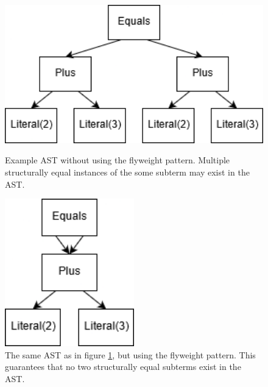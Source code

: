 \documentclass[11pt]{article}
\begin{document}
    \begin{figure}[H]
        \begin{center}
            \begin{minipage}{.4\textwidth}
                \begin{center}
                    \includegraphics[width=1.0\textwidth]{no-flyweight.png}
                    \caption{Example AST without using the flyweight pattern. Multiple structurally equal instances of the some subterm may exist in the AST.}
                    \label{fig:no-flyweight-ast}
                \end{center}
            \end{minipage}
            \hspace{.1\textwidth}
            \begin{minipage}{.35\textwidth}
                \begin{center}
                    \includegraphics[width=0.5\textwidth]{with-flyweight.png}
                    \caption{The same AST as in figure \ref{fig:no-flyweight-ast}, but using the flyweight pattern. This guarantees that no two structurally equal subterms exist in the AST.}
                \end{center}
            \end{minipage}
        \end{center}
    \end{figure}
\end{document}
